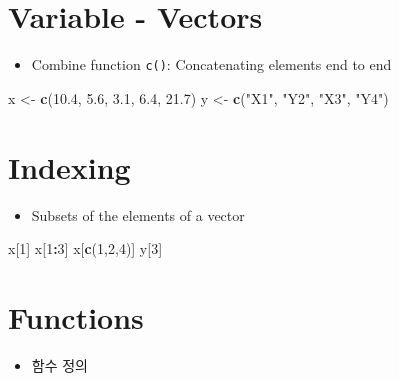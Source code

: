 \documentclass[
]{book}
\newenvironment{Shaded}{\begin{snugshade}}{\end{snugshade}}
\newcommand{\DecValTok}[1]{\textcolor[rgb]{0.00,0.00,0.81}{#1}}
\newcommand{\FloatTok}[1]{\textcolor[rgb]{0.00,0.00,0.81}{#1}}
\newcommand{\KeywordTok}[1]{\textcolor[rgb]{0.13,0.29,0.53}{\textbf{#1}}}
\newcommand{\NormalTok}[1]{#1}
\newcommand{\OperatorTok}[1]{\textcolor[rgb]{0.81,0.36,0.00}{\textbf{#1}}}
\newcommand{\StringTok}[1]{\textcolor[rgb]{0.31,0.60,0.02}{#1}}
\providecommand{\tightlist}{%
  \setlength{\itemsep}{0pt}\setlength{\parskip}{0pt}}
\begin{document}
\hypertarget{variable---vectors}{%
\section{Variable - Vectors}\label{variable---vectors}}

\begin{itemize}
\tightlist
\item
  Combine function \texttt{c()}: Concatenating elements end to end
\end{itemize}

\begin{Shaded}
\begin{Highlighting}[]
\NormalTok{x <{-}}\StringTok{ }\KeywordTok{c}\NormalTok{(}\FloatTok{10.4}\NormalTok{, }\FloatTok{5.6}\NormalTok{, }\FloatTok{3.1}\NormalTok{, }\FloatTok{6.4}\NormalTok{, }\FloatTok{21.7}\NormalTok{) }
\NormalTok{y <{-}}\StringTok{ }\KeywordTok{c}\NormalTok{(}\StringTok{"X1"}\NormalTok{, }\StringTok{"Y2"}\NormalTok{,  }\StringTok{"X3"}\NormalTok{,  }\StringTok{"Y4"}\NormalTok{)}
\end{Highlighting}
\end{Shaded}

\hypertarget{indexing}{%
\section{Indexing}\label{indexing}}

\begin{itemize}
\tightlist
\item
  Subsets of the elements of a vector
\end{itemize}

\begin{Shaded}
\begin{Highlighting}[]
\NormalTok{x[}\DecValTok{1}\NormalTok{]}
\NormalTok{x[}\DecValTok{1}\OperatorTok{:}\DecValTok{3}\NormalTok{]}
\NormalTok{x[}\KeywordTok{c}\NormalTok{(}\DecValTok{1}\NormalTok{,}\DecValTok{2}\NormalTok{,}\DecValTok{4}\NormalTok{)]}
\NormalTok{y[}\DecValTok{3}\NormalTok{]}
\end{Highlighting}
\end{Shaded}

\hypertarget{functions}{%
\section{Functions}\label{functions}}

\begin{itemize}
\tightlist
\item
  함수 정의
\end{itemize}
\end{document}
